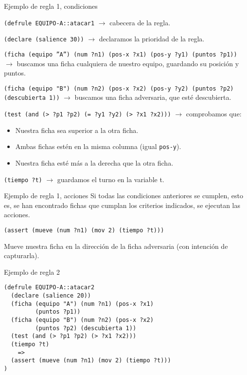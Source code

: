 \documentclass[smaller,spanish,xcolor=svgnames]{beamer}
\begin{document}
\begin{frame}[fragile]{Ejemplo de regla 1, condiciones}

\small
\texttt{(defrule EQUIPO-A::atacar1} $\rightarrow$ cabecera de la regla.

\medskip

\texttt{(declare (salience 30))} $\rightarrow$ declaramos la prioridad de la regla.

\medskip

\texttt{(ficha (equipo ''A'') (num ?n1) (pos-x ?x1) (pos-y ?y1) (puntos ?p1))} $\rightarrow$ buscamos una ficha cualquiera de nuestro equipo, guardando su posición y puntos.

\medskip

\texttt{(ficha (equipo "B") (num ?n2) (pos-x ?x2) (pos-y ?y2) (puntos ?p2) (descubierta 1))} $\rightarrow$ buscamos una ficha adversaria, que esté descubierta.

\medskip

\texttt{(test (and (> ?p1 ?p2) (= ?y1 ?y2) (> ?x1 ?x2)))} $\rightarrow$ comprobamos que:
\begin{itemize}
\item Nuestra ficha sea superior a la otra ficha.
\item Ambas fichas estén en la misma columna (igual \texttt{pos-y}).
\item Nuestra ficha esté más a la derecha que la otra ficha.
\end{itemize}

\medskip

\texttt{(tiempo ?t)} $\rightarrow$ guardamos el turno en la variable t.
\end{frame}

\begin{frame}{Ejemplo de regla 1, acciones}
  Si todas las condiciones anteriores se cumplen, esto es, se han encontrado
  fichas que cumplan los criterios indicados, se ejecutan las acciones.

  \medskip

  \texttt{(assert (mueve (num ?n1) (mov 2) (tiempo ?t)))}

  \medskip

  Mueve nuestra ficha en la dirección de la ficha adversaria (con intención de capturarla).
\end{frame}


\begin{frame}[fragile]{Ejemplo de regla 2}
\begin{verbatim}
(defrule EQUIPO-A::atacar2
  (declare (salience 20))
  (ficha (equipo "A") (num ?n1) (pos-x ?x1)
         (puntos ?p1))
  (ficha (equipo "B") (num ?n2) (pos-x ?x2)
         (puntos ?p2) (descubierta 1))
  (test (and (> ?p1 ?p2) (> ?x1 ?x2)))
  (tiempo ?t)
    =>
  (assert (mueve (num ?n1) (mov 2) (tiempo ?t)))
)
\end{verbatim}
\end{frame}
\end{document}
